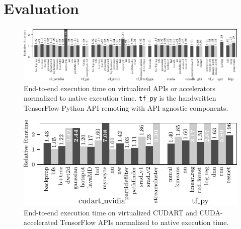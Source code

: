 
\section{Evaluation}
\label{s:eval}

\begin{figure}
  \centering
	\includegraphics[width=\textwidth]{ava/data/end2end/end2end_all.pdf}
    \vspace{-1.75em}
	\caption{End-to-end execution time on virtualized APIs or accelerators normalized to native execution time. \lstinline|tf_py| is the handwritten TensorFlow Python API remoting with \model API-agnostic components.}
	\label{fig:end2end}
\end{figure}

\begin{figure}
	\centering
	\includegraphics[width=\columnwidth]{ava/data/end2end/end2end_cudart.pdf}%
	\vspace*{-.1em}
	\caption{End-to-end execution time on virtualized CUDART and CUDA-accelerated TensorFlow APIs normalized to native execution time.}
	\label{fig:end2end_cudart}
\end{figure}

